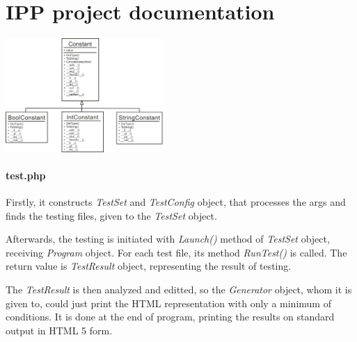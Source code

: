 \documentclass[10pt,a4paper,titlepage]{article}
\begin{document}

\setcounter{page}{1}

\section{IPP project documentation}

\begin{multicols}{2}
\includegraphics[width=0.45\textwidth]{interpret_constant.png}

\end{multicols}

\paragraph{test.php}
Firstly, it constructs {\it TestSet} and {\it TestConfig} object, that processes
the args and finds the testing files, given to the {\it TestSet} object.

Afterwards, the testing is initiated with {\it Launch()} method of
{\it TestSet} object, receiving {\it Program} object. For each test file,
its method {\it RunTest()} is called. The return value is {\it TestResult}
object, representing the result of testing.

The {\it TestResult} is then analyzed and editted, so the {\it Generator}
object, whom it is given to, could just print the HTML representation with only
a minimum of conditions. It is done at the end of program, printing the
results on standard output in HTML 5 form.
\end{document}
